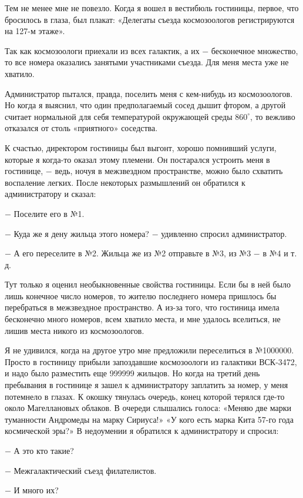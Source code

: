 \documentclass{article}
\begin{document}
Тем не менее мне не повезло. Когда я вошел в вестибюль гостиницы, первое, что бросилось в глаза, был плакат: «Делегаты съезда космозоологов регистрируются на 127-м этаже».

Так как космозоологи приехали из всех галактик, а их \(-\) бесконечное множество, то все номера оказались занятыми участниками съезда. Для меня места уже не хватило.

Администратор пытался, правда, поселить меня с кем-нибудь из космозоологов. Но когда я выяснил, что один предполагаемый сосед дышит фтором, а другой считает нормальной для себя температурой окружающей среды \(860 ^ \circ\), то вежливо отказался от столь «приятного» соседства.

К счастью, директором гостиницы был выгонт, хорошо помнивший услуги, которые я когда-то оказал этому племени. Он постарался устроить меня в гостинице, \(-\) ведь, ночуя в межзвездном пространстве, можно было схватить воспаление легких. После некоторых размышлений он обратился к администратору и сказал:

\(-\) Поселите его в №1.

\(-\) Куда же я дену жильца этого номера? \(-\) удивленно спросил администратор.

\(-\) А его переселите в №2. Жильца же из №2 отправьте в №3, из №3 \(-\) в №4 и т. д.

Тут только я оценил необыкновенные свойства гостиницы. Если бы в ней было лишь конечное число номеров, то жителю последнего номера пришлось бы перебраться в межзвездное пространство. А из-за того, что гостиница имела бесконечно много номеров, всем хватило места, и мне удалось вселиться, не лишив места никого из космозоологов.

Я не удивился, когда на другое утро мне предложили переселиться в №1000000. Просто в гостиницу прибыли запоздавшие космозоологи из галактики ВСК-3472, и надо было разместить еще 999999 жильцов. Но когда на третий день пребывания в гостинице я зашел к администратору заплатить за номер, у меня потемнело в глазах. К окошку тянулась очередь, конец которой терялся где-то около Магеллановых облаков. В очереди слышались голоса: «Меняю две марки туманности Андромеды на марку Сириуса!» «У кого есть марка Кита 57-го года космической эры?» В недоумении я обратился к администратору и спросил:

\(-\) А это кто такие?

\(-\) Межгалактический съезд филателистов.

\(-\) И много их?
\end{document}
